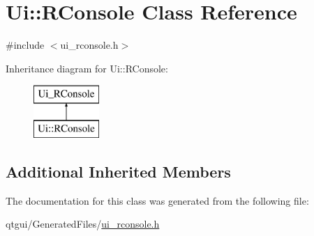 \hypertarget{class_ui_1_1_r_console}{}\section{Ui\+::R\+Console Class Reference}
\label{class_ui_1_1_r_console}


{\ttfamily \#include $<$ui\+\_\+rconsole.\+h$>$}

Inheritance diagram for Ui\+::R\+Console\+:\begin{figure}[H]
\begin{center}
\leavevmode
\includegraphics[height=2.000000cm]{df/d1d/class_ui_1_1_r_console}
\end{center}
\end{figure}
\subsection*{Additional Inherited Members}


The documentation for this class was generated from the following file\+:\begin{DoxyCompactItemize}
\item 
qtgui/\+Generated\+Files/\mbox{\hyperlink{ui__rconsole_8h}{ui\+\_\+rconsole.\+h}}\end{DoxyCompactItemize}

